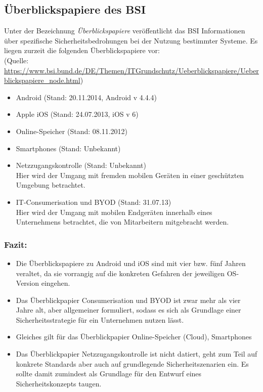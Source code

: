 \subsection{Überblickspapiere des BSI}

Unter der Bezeichnung \emph{Überblickspapiere} veröffentlicht das BSI Informationen über spezifische Sicherheitsbedrohungen bei der Nutzung bestimmter Systeme. Es liegen zurzeit die folgenden Überblickspapiere vor:\\
(Quelle: \url{https://www.bsi.bund.de/DE/Themen/ITGrundschutz/Ueberblickspapiere/Ueberblickspapiere_node.html})

\begin{itemize}
	\item Android (Stand: 20.11.2014, Android v 4.4.4)
	\item Apple iOS (Stand: 24.07.2013, iOS v 6)
	\item Online-Speicher (Stand: 08.11.2012)
	\item Smartphones (Stand: Unbekannt)
	\item Netzzugangskontrolle (Stand: Unbekannt)\\
	Hier wird der Umgang mit fremden mobilen Geräten in einer geschützten Umgebung betrachtet.
	\item IT-Consumerisation und BYOD (Stand: 31.07.13)\\
	Hier wird der Umgang mit mobilen Endgeräten innerhalb eines Unternehmens betrachtet, die von Mitarbeitern mitgebracht werden.
\end{itemize}

\subsubsection{Fazit:}

\begin{itemize}
	\item Die Überblickspapiere zu Android und iOS sind mit vier bzw. fünf Jahren veraltet, da sie vorrangig auf die konkreten Gefahren der jeweiligen OS-Version eingehen.
	\item Das Überblickpapier Consumerisation und BYOD ist zwar mehr als vier Jahre alt, aber allgemeiner formuliert, sodass es sich als Grundlage einer Sicherheitsstrategie für ein Unternehmen nutzen lässt.
	\item Gleiches gilt für das Überblickpapier Online-Speicher (Cloud), Smartphones
	\item Das Überblickpapier Netzzugangskontrolle ist nicht datiert, geht zum Teil auf konkrete Standards aber auch auf grundlegende Sicherheitszenarien ein. Es sollte damit zumindest als Grundlage für den Entwurf eines Sicherheitskonzepts taugen.
\end{itemize}